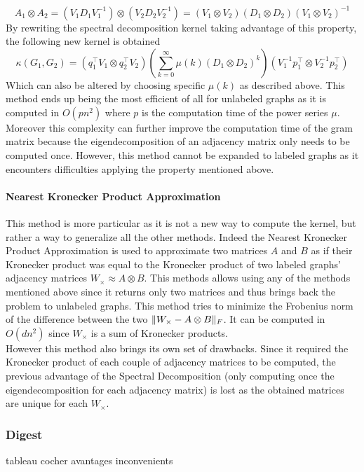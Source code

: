 \documentclass{article}
\DeclarePairedDelimiter{\norm}{\lVert}{\rVert}
\theoremstyle{definition}
\begin{document}
\begin{equation}
	A_1 \otimes A_2=(V_{1}D_{1}V_{1}^{-1})\otimes(V_{2}D_{2}V_{2}^{-1})=(V_1\otimes V_2)(D_1 \otimes D_2)(V_1 \otimes V_2)^{-1}
\end{equation}
By rewriting the spectral decomposition kernel taking advantage of this property, the following new kernel is obtained
\begin{equation}
	\kappa(G_1,G_2)=(q_{1}^{\top}V_{1}\otimes q_{2}^{\top}V_{2})(\sum\limits_{k=0}^{\infty}\mu(k)(D_{1}\otimes D_{2})^k)(V_{1}^{-1}p_{1}^{\top}\otimes V_{2}^{-1}p_{2}^{\top})
\end{equation}
Which can also be altered by choosing specific $\mu(k)$ as described above. This method ends up being the most efficient of all for unlabeled graphs as it is computed in $O(pn^2)$ where $p$ is the computation time of the power series $\mu$. Moreover this complexity can further improve the computation time of the gram matrix because the eigendecomposition of an adjacency matrix only needs to be computed once. However, this method cannot be expanded to labeled graphs as it encounters difficulties applying the property mentioned above.
\paragraph{Nearest Kronecker Product Approximation}
This method is more particular as it is not a new way to compute the kernel, but rather a way to generalize all the other methods. Indeed the Nearest Kronecker Product Approximation\cite{van1993approximation} is used to approximate two matrices $A$ and $B$ as if their Kronecker product was equal to the Kronecker product of two labeled graphs' adjacency matrices $W_{\times} \approx A \otimes B$. This methods allows using any of the methods mentioned above since it returns only two matrices and thus brings back the problem to unlabeled graphs. This method tries to minimize the Frobenius norm of the difference between the two $\norm{W_\times - A\otimes B}_F$. It can be computed in $O(dn^2)$ since $W_\times$ is a sum of Kronecker products.\\
However this method also brings its own set of drawbacks. Since it required the Kronecker product of each couple of adjacency matrices to be computed, the previous advantage of the Spectral Decomposition (only computing once the eigendecomposition for each adjacency matrix) is lost as the obtained matrices are unique for each $W_\times$.

\subsubsection{Digest}
tableau cocher avantages inconvenients
\end{document}
